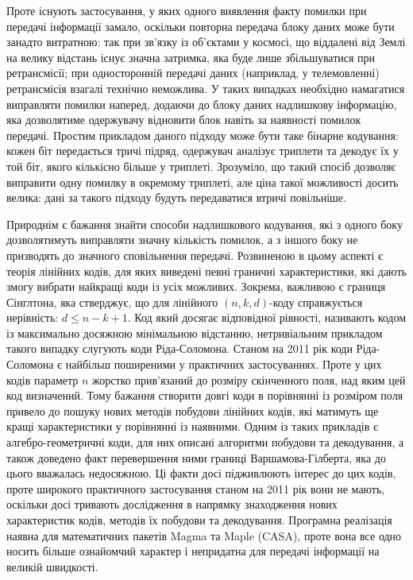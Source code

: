 \documentclass[a4paper,14pt,oneside]{extarticle}
\begin{document}
Проте існують застосування, у яких одного виявлення факту помилки при передачі інформації замало, оскільки повторна передача блоку даних може бути занадто витратною: 
так при зв'язку із об'єктами у космосі, що віддалені від Землі на велику відстань існує значна затримка, яка буде лише збільшуватися при ретрансмісії; 
при односторонній передачі даних (наприклад, у телемовленні) ретрансмісія взагалі технічно неможлива. 
У таких випадках необхідно намагатися виправляти помилки наперед, додаючи до блоку даних надлишкову інформацію, яка дозволятиме одержувачу відновити блок навіть за наявності помилок передачі. 
Простим прикладом даного підходу може бути таке бінарне кодування: кожен біт передається тричі підряд, одержувач аналізує триплети та декодує їх у той біт, якого кількісно більше у триплеті. 
Зрозуміло, що такий спосіб дозволяє виправити одну помилку в окремому триплеті, але ціна такої можливості досить велика: дані за такого підходу будуть передаватися втричі повільніше.

Природнім є бажання знайти способи надлишкового кодування, які з одного боку дозволятимуть виправляти значну кількість помилок, а з іншого боку не призводять до значного сповільнення передачі. 
Розвиненою в цьому аспекті є теорія лінійних кодів,  для яких виведені певні граничні характеристики, які дають змогу вибрати найкращі коди із усіх можливих. 
Зокрема, важливою є границя Сінглтона, яка стверджує, що для лінійного $(n, k, d)$-коду справжується нерівність: $d \le n-k+1$. 
Код який досягає відповідної рівності, називають кодом із максимально досяжною мінімальною відстанню, нетривіальним прикладом такого випадку слугують коди Ріда-Соломона.
Станом на 2011 рік коди Ріда-Соломона є найбільш поширеними у практичних застосуваннях. Проте у цих кодів параметр $n$ жорстко прив'язаний до розміру скінченного поля, над яким цей код визначений.
Тому бажання створити довгі коди в порівнянні із розміром поля привело до пошуку нових методів побудови лінійних кодів, які матимуть ще кращі характеристики у порівнянні із наявними.
Одним із таких прикладів є алгебро-геометричні коди, для них описані алгоритми побудови та декодування, а також доведено факт перевершення ними границі Варшамова-Гілберта, яка до цього вважалась недосяжною.
Ці факти досі підживлюють інтерес до цих кодів, проте широкого практичного застосування станом на 2011 рік вони не мають, оскільки досі тривають дослідження в напрямку знаходження нових характеристик кодів, методів їх побудови та декодування. Програмна реалізація наявна для математичних пакетів Magma та Maple (CASA), проте вона все одно носить більше ознайомчий характер і непридатна для передачі інформації на великій швидкості.
\end{document}
